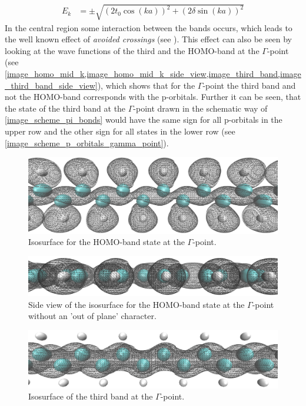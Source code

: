 \begin{align}
E_k &= \pm \sqrt{\left(2t_0\cos(ka)\right)^2+\left(2\delta\sin(ka)\right)^2}
\label{equation_explicit_energy_band}
\end{align} In the central region some interaction between the bands occurs, which leads to the well known effect of \emph{avoided crossings} (see \cite{ashcroft}). This effect can also be seen by looking at the wave functions of the third and the HOMO-band at the $\Gamma$-point (see \cref{image_homo_mid_k,image_homo_mid_k_side_view,image_third_band,image_third_band_side_view}), which shows that for the $\Gamma$-point the third band and not the HOMO-band corresponds with the p-orbitals. Further it can be seen, that the state of the third band at the $\Gamma$-point drawn in the schematic way of \cref{image_scheme_pi_bonds} would have the same sign for all p-orbitals in the upper row and the other sign for all states in the lower row (see \cref{image_scheme_p_orbitals_gamma_point}).\\
\begin{figure}
	\centering
	\includegraphics[width = 12cm]{Images/polyacetylene/wavefunctions/Homo_mid_k}
	\caption{Isosurface for the HOMO-band state at the $\Gamma$-point.}
	\label{image_homo_mid_k}
\end{figure}
\begin{figure}
	\centering
	\includegraphics[width = 12cm]{Images/polyacetylene/wavefunctions/Homo_mid_k_Side_View}
	\caption{Side view of the isosurface for the HOMO-band state at the $\Gamma$-point without an 'out of plane' character.}
	\label{image_homo_mid_k_side_view}
\end{figure}
\begin{figure}
	\centering
	\includegraphics[width = 12cm]{Images/polyacetylene/wavefunctions/Mid_band_2}
	\caption{Isosurface of the third band at the $\Gamma$-point.}
	\label{image_third_band}
\end{figure}
